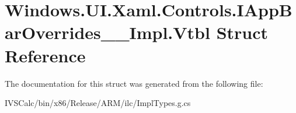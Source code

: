 \hypertarget{struct_windows_1_1_u_i_1_1_xaml_1_1_controls_1_1_i_app_bar_overrides_____impl_1_1_vtbl}{}\section{Windows.\+U\+I.\+Xaml.\+Controls.\+I\+App\+Bar\+Overrides\+\_\+\+\_\+\+Impl.\+Vtbl Struct Reference}
\label{struct_windows_1_1_u_i_1_1_xaml_1_1_controls_1_1_i_app_bar_overrides_____impl_1_1_vtbl}


The documentation for this struct was generated from the following file\+:\begin{DoxyCompactItemize}
\item 
I\+V\+S\+Calc/bin/x86/\+Release/\+A\+R\+M/ilc/Impl\+Types.\+g.\+cs\end{DoxyCompactItemize}
